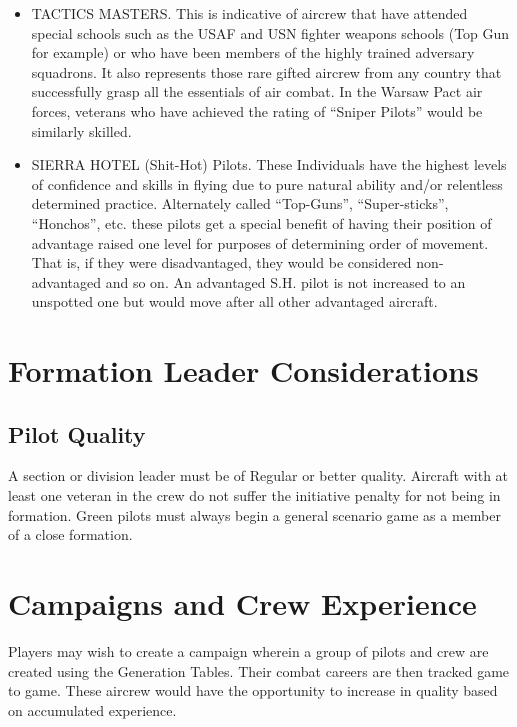 \begin{advancedrules}
\begin{itemize}
        \item TACTICS MASTERS. This is indicative of aircrew that have attended special schools such as the USAF and USN fighter weapons schools (Top Gun for example) or who have been members of the highly trained adversary squadrons. It also represents those rare gifted aircrew from any country that successfully grasp all the essentials of air combat. In the Warsaw Pact air forces, veterans who have achieved the rating of “Sniper Pilots” would be similarly skilled.

        \item SIERRA HOTEL (Shit-Hot) Pilots. These Individuals have the highest levels of confidence and skills in flying due to pure natural ability and/or relentless determined practice. Alternately called “Top-Guns”, “Super-sticks”, “Honchos”, etc. these pilots get a special benefit of having their position of advantage raised one level for purposes of determining order of movement. That is, if they were disadvantaged, they would be considered non-advantaged and so on. An advantaged S.H. pilot is not increased to an unspotted one but would move after all other advantaged aircraft. 

    \end{itemize}

    \section{Formation Leader Considerations}

    \subsection{Pilot Quality} A section or division leader must be of Regular or better quality. Aircraft with at least one veteran in the crew do not suffer the initiative penalty for not being in formation. Green pilots must always begin a general scenario game as a member of a close formation.

    \section{Campaigns and Crew Experience}

    Players may wish to create a campaign wherein a group of pilots and crew are created using the Generation Tables. Their combat careers are then tracked game to game. These aircrew would have the opportunity to increase in quality based on accumulated experience.


\end{advancedrules}
